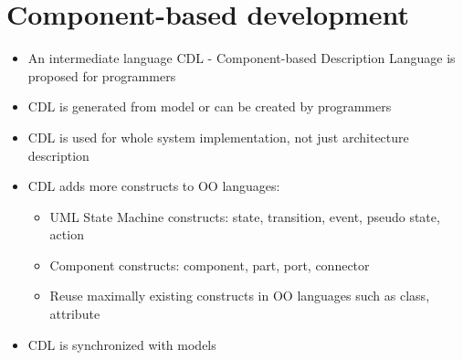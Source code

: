 \section{Component-based development}
\begin{itemize}
	\item An intermediate language CDL - Component-based Description Language is proposed for programmers
	\item CDL is generated from model or can be created by programmers
	\item CDL is used for whole system implementation, not just architecture description
	\item CDL adds more constructs to OO languages:
	\begin{itemize}
		\item UML State Machine constructs: state, transition, event, pseudo state, action
		
		\item Component constructs: component, part, port, connector
		
		\item Reuse maximally existing constructs in OO languages such as class, attribute
	\end{itemize}
	
	\item CDL is synchronized with models
\end{itemize}

